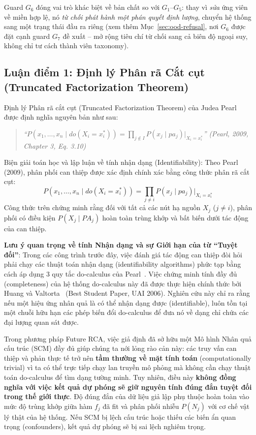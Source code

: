 \documentclass[11pt,a4paper]{article}
\begin{document}
Guard $G_6$ đóng vai trò khác biệt về bản chất so với $G_1$--$G_5$: thay vì \emph{sửa} ứng viên về miền hợp lệ, nó \emph{từ chối phát hành một phán quyết định lượng}, chuyển hệ thống sang một trạng thái đầu ra riêng (xem thêm Mục~\ref{sec:ood-refusal}, nơi $G_6$ được đặt cạnh guard $G_7$ đề xuất -- mở rộng tiêu chí từ chối sang cả biên độ ngoại suy, không chỉ tư cách thành viên taxonomy).

\subsection{Luận điểm 1: Định lý Phân rã Cắt cụt (Truncated Factorization Theorem)}

Định lý Phân rã cắt cụt (Truncated Factorization Theorem) của Judea Pearl được định nghĩa nguyên bản như sau:
\begin{quote}
\itshape
``$P(x_1, \dots, x_n \mid do(X_i = x_i^*)) = \prod_{j \notin I} P(x_j \mid pa_j) \Big|_{X_i = x_i^*}$'' (Pearl, 2009, Chapter 3, Eq. 3.10)
\end{quote}

Biện giải toán học và lập luận về tính nhận dạng (Identifiability):
Theo Pearl (2009), phân phối can thiệp được xác định chính xác bằng công thức phân rã cắt cụt:
\begin{equation}
P(x_1, \dots, x_n \mid do(X_i = x_i^*)) = \prod_{j \neq i} P(x_j \mid pa_j) \Big|_{X_i = x_i^*}
\end{equation}
Công thức trên chứng minh rằng đối với tất cả các nút hạ nguồn $X_j$ ($j \neq i$), phân phối có điều kiện $P(X_j \mid PA_j)$ hoàn toàn trùng khớp và bất biến dưới tác động của can thiệp.

\textbf{Lưu ý quan trọng về tính Nhận dạng và sự Giới hạn của từ ``Tuyệt đối''}:
Trong các công trình trước đây, việc đánh giá tác động can thiệp đòi hỏi phải chạy các thuật toán nhận dạng (identifiability algorithms) phức tạp bằng cách áp dụng 3 quy tắc do-calculus của Pearl~\cite{pearl1995diagrams}. Việc chứng minh tính đầy đủ (completeness) của hệ thống do-calculus này đã được thực hiện chính thức bởi Huang và Valtorta~\cite{huang2006complete} (Best Student Paper, UAI 2006). Nghiên cứu này chỉ ra rằng nếu một hiệu ứng nhân quả là có thể nhận dạng được (identifiable), luôn tồn tại một chuỗi hữu hạn các phép biến đổi do-calculus để đưa nó về dạng chỉ chứa các đại lượng quan sát được.

Trong phương pháp Future RCA, việc giả định đã sở hữu một Mô hình Nhân quả cấu trúc (SCM) đầy đủ giúp chúng ta nới lỏng rào cản này: các truy vấn can thiệp và phản thực tế trở nên \textbf{tầm thường về mặt tính toán} (computationally trivial) vì ta có thể trực tiếp chạy lan truyền mô phỏng mà không cần chạy thuật toán do-calculus để tìm dạng tường minh. Tuy nhiên, điều này \textbf{không đồng nghĩa với việc kết quả dự phóng sẽ giữ nguyên tính đúng đắn tuyệt đối trong thế giới thực}. Độ đúng đắn của dữ liệu giả lập phụ thuộc hoàn toàn vào mức độ trùng khớp giữa hàm $f_j$ đã fit và phân phối nhiễu $P(N_j)$ với cơ chế vật lý thật của hệ thống. Nếu SCM bị lệch cấu trúc hoặc thiếu các biến ẩn quan trọng (confounders), kết quả dự phóng sẽ bị sai lệch nghiêm trọng.
\end{document}
